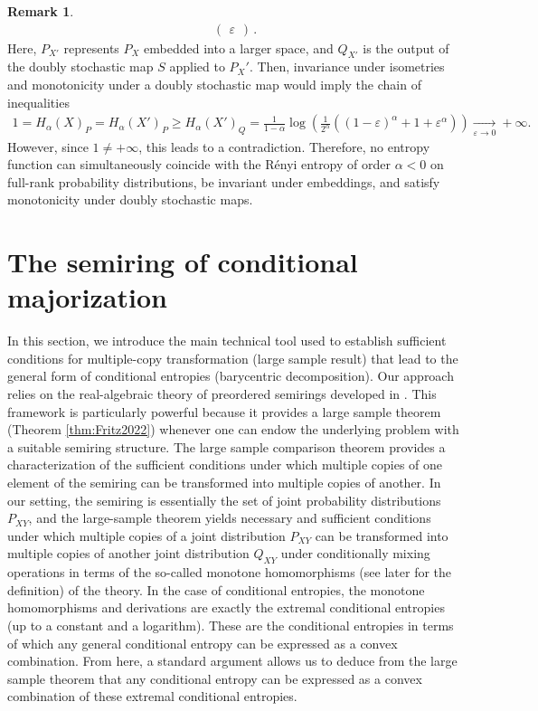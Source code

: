 \documentclass[aps,pra,11pt,onecolumn,nofootinbib,tightenlines]{revtex4-2}
\theoremstyle{definition}
\newtheorem{remark}[theorem]{Remark}
\begin{document}
\begin{remark}
\begin{align}
\begin{pmatrix}
           \varepsilon
       \end{pmatrix} \,.
    \end{align}
Here, $P_{X'}$ represents $P_X$ embedded into a larger space, and $Q_{X'}$ is the output of the doubly stochastic map $S$ applied to $P_X'$. Then, invariance under isometries and monotonicity under a doubly stochastic map would imply the chain of inequalities
    \begin{align}
        1= H_\alpha(X)_P = H_\alpha(X')_P \geq H_\alpha(X')_Q = \frac{1}{1-\alpha}\log{\left(\frac{1}{2^\alpha}\left((1-\varepsilon)^{\alpha}+1+\varepsilon^\alpha\right)\right)} \xrightarrow[\varepsilon \to 0]{} +\infty.
    \end{align}
However, since $1 \neq  +\infty$, this leads to a contradiction. Therefore, no entropy function can simultaneously coincide with the Rényi entropy of order $\alpha < 0$ on full-rank probability distributions, be invariant under embeddings, and satisfy monotonicity under doubly stochastic maps.
\end{remark}

\section{The semiring of conditional majorization}
\label{sec: semiring of conditional entropies}
In this section, we introduce the main technical tool used to establish sufficient conditions for multiple-copy transformation (large sample result) that lead to the general form of conditional entropies (barycentric decomposition). Our approach relies on the real-algebraic theory of preordered semirings developed in \cite{fritz2023abstract,fritz2023abstractII}. This framework is particularly powerful because it provides a large sample theorem (Theorem \ref{thm:Fritz2022}) whenever one can endow the underlying problem with a suitable semiring structure.
The large sample comparison theorem provides a characterization of the sufficient conditions under which multiple copies of one element of the semiring can be transformed into multiple copies of another. 
In our setting, the semiring is essentially the set of joint probability distributions $P_{XY}$, and the large-sample theorem yields necessary and sufficient conditions under which multiple copies of a joint distribution $P_{XY}$ can be transformed into multiple copies of another joint distribution $Q_{XY}$ under conditionally mixing operations in terms of the so-called monotone homomorphisms (see later for the definition) of the theory. In the case of conditional entropies, the monotone homomorphisms and derivations are exactly the extremal conditional entropies (up to a constant and a logarithm). These are the conditional entropies in terms of which any general conditional entropy can be expressed as a convex combination. From here, a standard argument \cite{mu21_renyi,haapasalo_inprep} allows us to deduce from the large sample theorem that any conditional entropy can be expressed as a convex combination of these extremal conditional entropies.
\end{document}
